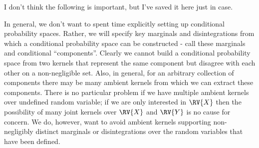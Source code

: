 
I don't think the following is important, but I've saved it here just in case.

In general, we don't want to spent time explicitly setting up conditional probability spaces. Rather, we will specify key marginals and disintegrations from which a conditional probability space can be constructed - call these marginals and conditional ``components''. Clearly we cannot build a conditional probability space from two kernels that represent the same component but disagree with each other on a non-negligible set. Also, in general, for an arbitrary collection of components there may be many ambient kernels from which we can extract these components. There is no particular problem if we have multiple ambient kernels over undefined random variable; if we are only interested in $\RV{X}$ then the possibility of many joint kernels over $\RV{X}$ and $\RV{Y}$ is no cause for concern. We do, however, want to avoid ambient kernels supporting non-negligibly distinct marginals or disintegrations over the random variables that have been defined. 

